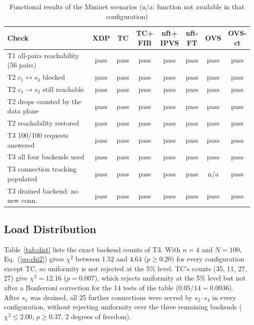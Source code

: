 \documentclass[conference]{IEEEtran}
\begin{document}
\begin{table}[t]
\caption{Functional results of the Mininet scenarios (n/a: function not
available in that configuration)}
\label{tab:correct}
\centering\scriptsize
\setlength{\tabcolsep}{1.6pt}
\begin{tabular}{@{}lccccccc@{}}
\toprule
Check & XDP & TC & \shortstack{TC+\\FIB} & \shortstack{nft+\\IPVS} & \shortstack{nft-\\FT} & OVS & \shortstack{OVS-\\ct} \\
\midrule
T1 all-pairs reachability (56 pairs) & pass & pass & pass & pass & pass & pass & pass \\
T2 $c_1 \leftrightarrow s_3$ blocked & pass & pass & pass & pass & pass & pass & pass \\
T2 $c_1 \to s_2$ still reachable & pass & pass & pass & pass & pass & pass & pass \\
T2 drops counted by the data plane & pass & pass & pass & pass & pass & pass & pass \\
T2 reachability restored & pass & pass & pass & pass & pass & pass & pass \\
T3 100/100 requests answered & pass & pass & pass & pass & pass & pass & pass \\
T3 all four backends used & pass & pass & pass & pass & pass & pass & pass \\
T3 connection tracking populated & pass & pass & pass & pass & pass & n/a & pass \\
T3 drained backend: no new conn. & pass & pass & pass & pass & pass & pass & pass \\
\bottomrule
\end{tabular}
\end{table}

\subsection{Load Distribution}
\label{sec:loaddist}
Table~\ref{tab:dist} lists the exact backend counts of T3. With $n=4$ and
$N=100$, Eq.~(\ref{eq:chi2}) gives $\chi^2$ between $1.52$ and $4.64$
($p \ge 0.20$) for every configuration except TC, so uniformity is not
rejected at the 5\% level. TC's counts (35, 11, 27, 27) give $\chi^2=12.16$
($p=0.007$), which rejects uniformity at the 5\% level but not after a
Bonferroni correction for the 14 tests of the table ($0.05/14=0.0036$).
After $s_1$ was drained, all 25 further connections were served by
$s_2$--$s_4$ in every configuration, without rejecting uniformity over the
three remaining backends ($\chi^2 \le 2.00$, $p \ge 0.37$, 2 degrees of
freedom).
\end{document}
